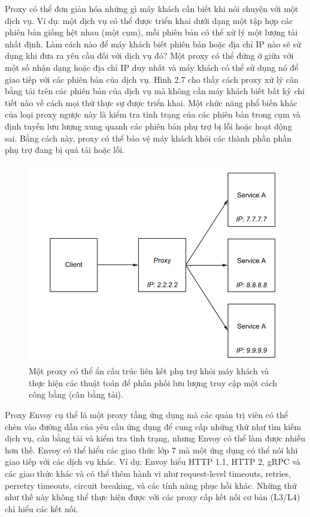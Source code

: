 \documentclass[14pt,a4paper]{book}
\begin{document}
		Proxy có thể đơn giản hóa những gì máy khách cần biết khi nói chuyện với một dịch vụ. Ví dụ: một dịch vụ có thể được triển khai dưới dạng một tập hợp các phiên bản giống hệt nhau (một cụm), mỗi phiên bản có thể xử lý một lượng tải nhất định. Làm cách nào để máy khách biết phiên bản hoặc địa chỉ IP nào sẽ sử dụng khi đưa ra yêu cầu đối với dịch vụ đó? Một proxy có thể đứng ở giữa với một số nhận dạng hoặc địa chỉ IP duy nhất và máy khách có thể sử dụng nó để giao tiếp với các phiên bản của dịch vụ. Hình 2.7 cho thấy cách proxy xử lý cân bằng tải trên các phiên bản của dịch vụ mà không cần máy khách biết bất kỳ chi tiết nào về cách mọi thứ thực sự được triển khai. Một chức năng phổ biến khác của loại proxy ngược này là kiểm tra tình trạng của các phiên bản trong cụm và định tuyến lưu lượng xung quanh các phiên bản phụ trợ bị lỗi hoặc hoạt động sai. Bằng cách này, proxy có thể bảo vệ máy khách khỏi các thành phần phần phụ trợ đang bị quá tải hoặc lỗi.
		
		\begin{figure}[h]
			\centering
			\includegraphics[width=0.7\linewidth]{Pics/2.1.3-p2}
			\caption{Một proxy có thể ẩn cấu trúc liên kết phụ trợ khỏi máy khách và thực hiện các thuật toán để phân phối lưu lượng truy cập một cách công bằng (cân bằng tải).}
			\label{fig:2.1.3-2}
		\end{figure}
		
		Proxy Envoy cụ thể là một proxy tầng ứng dụng mà các quản trị viên có thể chèn vào đường dẫn của yêu cầu ứng dụng để cung cấp những thứ như tìm kiếm dịch vụ, cân bằng tải và kiểm tra tình trạng, nhưng Envoy có thể làm được nhiều hơn thế. Envoy có thể hiểu các giao thức lớp 7 mà một ứng dụng có thể nói khi giao tiếp với các dịch vụ khác. Ví dụ: Envoy hiểu HTTP 1.1, HTTP 2, gRPC và các giao thức khác và có thể thêm hành vi như request-level timeouts, retries, perretry timeouts, circuit breaking, và các tính năng phục hồi khác. Những thứ như thế này không thể thực hiện được với các proxy cấp kết nối cơ bản (L3/L4) chỉ hiểu các kết nối.
		
\end{document}
